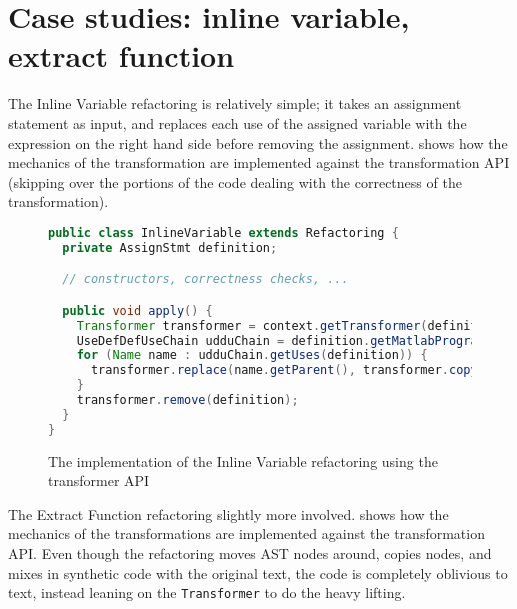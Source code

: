 \section{Case studies: inline variable, extract function}

The Inline Variable refactoring is relatively simple; it takes an assignment
statement as input, and replaces each use of the assigned variable with the
expression on the right hand side before removing the assignment.
 shows how the mechanics of the transformation are
implemented against the transformation API (skipping over the portions of the
code dealing with the correctness of the transformation).

\begin{figure}
\begin{lstlisting}[numbers=none, language=Java]
public class InlineVariable extends Refactoring {
  private AssignStmt definition;

  // constructors, correctness checks, ...

  public void apply() {
    Transformer transformer = context.getTransformer(definition);
    UseDefDefUseChain udduChain = definition.getMatlabProgram().analyze().getUseDefDefUseChain();
    for (Name name : udduChain.getUses(definition)) {
      transformer.replace(name.getParent(), transformer.copy(definition.getRHS()));
    }
    transformer.remove(definition);
  }
}
\end{lstlisting}
\caption{The implementation of the Inline Variable refactoring using the transformer API}
\label{Fig:InlineVariable}
\end{figure}

The Extract Function refactoring slightly more involved.
 shows how the mechanics of the transformations are
implemented against the transformation API. Even though the refactoring moves
AST nodes around, copies nodes, and mixes in synthetic code with the original text,
the code is completely oblivious to text, instead leaning on the {\tt Transformer}
to do the heavy lifting.

